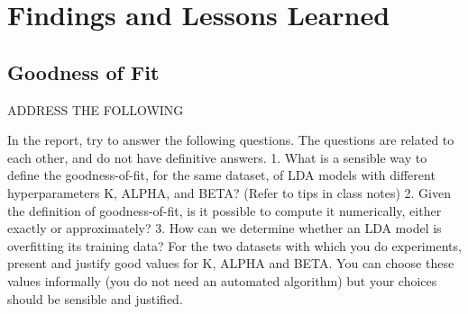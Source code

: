 \documentclass[11pt,a4paper,oneside]{article}
\begin{document}
\section{Findings and Lessons Learned}
\label{Lessons}

\subsection{Goodness of Fit}
ADDRESS THE FOLLOWING

In the report, try to answer the following questions. The questions are related to each other, and do not have definitive answers.
1. What is a sensible way to define the goodness-of-fit, for the same dataset, of LDA models with different hyperparameters K, ALPHA, and BETA? (Refer to tips in class notes)
2. Given the definition of goodness-of-fit, is it possible to compute it numerically, either exactly or approximately?
3. How can we determine whether an LDA model is overfitting its training data?
For the two datasets with which you do experiments, present and justify good values for K, ALPHA and BETA. You can choose these values informally (you do not need an automated algorithm) but your choices should be sensible and justified.



\end{document}
